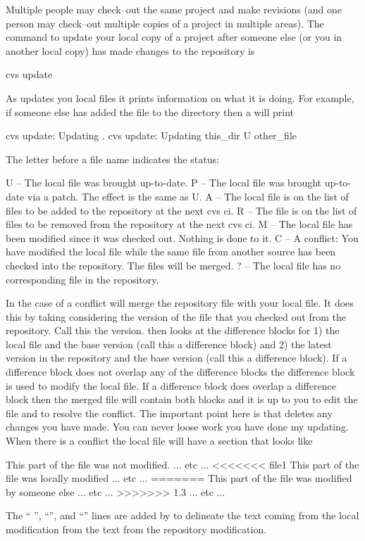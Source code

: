 Multiple people may check--out the same project and make revisions
(and one person may check--out multiple copies of a project in
multiple areas). The command to update your local copy of a project
after someone else (or you in another local copy) has made changes to
the repository is
\begin{example}
  cvs update
\end{example}
As \cvs updates you local files it prints information on what it is
doing. For example, if someone else has added the file 
to the  directory then a  will print
\begin{example}
  cvs update: Updating .
  cvs update: Updating this_dir
  U other_file
\end{example}
The letter before a file name indicates the status:
\begin{example}
  U -- The local file was brought up-to-date.
  P -- The local file was brought up-to-date via a patch. The effect is the same as U.
  A -- The local file is on the list of files to be added to the repository
          at the next cvs ci.
  R -- The file is on the list of files to be removed from the repository
          at the next cvs ci.
  M -- The local file has been modified since it was checked out. 
          Nothing is done to it.
  C -- A conflict: You have modified the local file while the same file
          from another source has been checked into the repository.
          The files will be merged.
  ? -- The local file has no corresponding file in the repository.
\end{example}
In the case of a conflict \cvs will merge the repository file with
your local file. It does this by taking considering the version of the
file that you checked out from the repository. Call this the 
version. \cvs then looks at the difference blocks for 1) the local
file and the base version (call this a  difference block)
and 2) the latest version in the repository and the base version (call
this a  difference block). If a 
difference block does not overlap any of the  difference
blocks the difference block is used to modify the local file. If a
 difference block does overlap a  difference
block then the merged file will contain both blocks and it is up to
you to edit the file and to resolve the conflict. The important point
here is that  deletes any changes you have made. You
can never loose work you have done my updating. When there is a
conflict the local file will have a section that looks like
\begin{example}
  This part of the file was not modified.
  ... etc ...
  <<<<<<< file1
  This part of the file was locally modified
  ... etc ...
  =======
  This part of the file was modified by someone else
  ... etc ...
  >>>>>>> 1.3
  ... etc ...
\end{example}
The ``\vn{<{<}<{<}<{<}<} '', ``\vn{=======}'', and ``''
lines are added by \cvs to delineate the text coming from the local
modification from the text from the repository modification.

